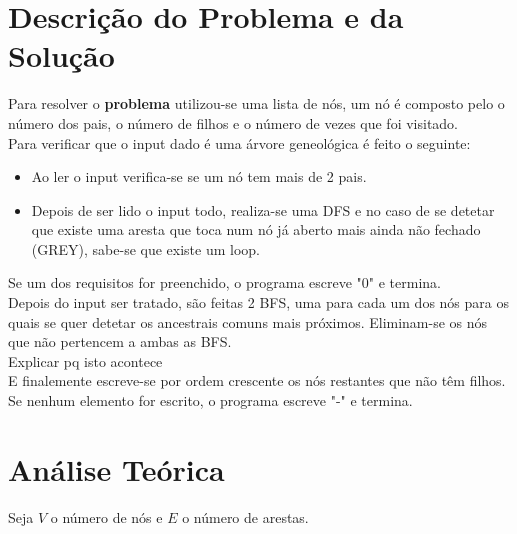 \documentclass[12pt,a4paper]{article}
\begin{document}
  \section{Descrição do Problema e da Solução}

  Para resolver o \textbf{problema} utilizou-se uma lista de nós, um nó é composto pelo o número dos pais, o número de filhos e o número de vezes que foi visitado.\\
  Para verificar que o input dado é uma árvore geneológica é feito o seguinte:
  
  \begin{itemize}
    \setlength{\itemsep}{0pt}
      \item Ao ler o input verifica-se se um nó tem mais de 2 pais.
      \item Depois de ser lido o input todo, realiza-se uma DFS e no caso de se detetar que existe uma aresta que toca num nó já aberto mais ainda não fechado (GREY), sabe-se que existe um loop.
  \end{itemize}
  Se um dos requisitos for preenchido, o programa escreve "0" e termina.\\
  Depois do input ser tratado, são feitas 2 BFS, uma para cada um dos nós para os quais se quer detetar os ancestrais comuns mais próximos.
  Eliminam-se os nós que não pertencem a ambas as BFS.\\
  Explicar pq isto acontece\\
  E finalemente escreve-se por ordem crescente os nós restantes que não têm filhos.\\
 Se nenhum elemento for escrito, o programa escreve "-" e termina.

  \section{Análise Teórica}

  Seja $V$ o número de nós e $E$ o número de arestas.
\end{document}
